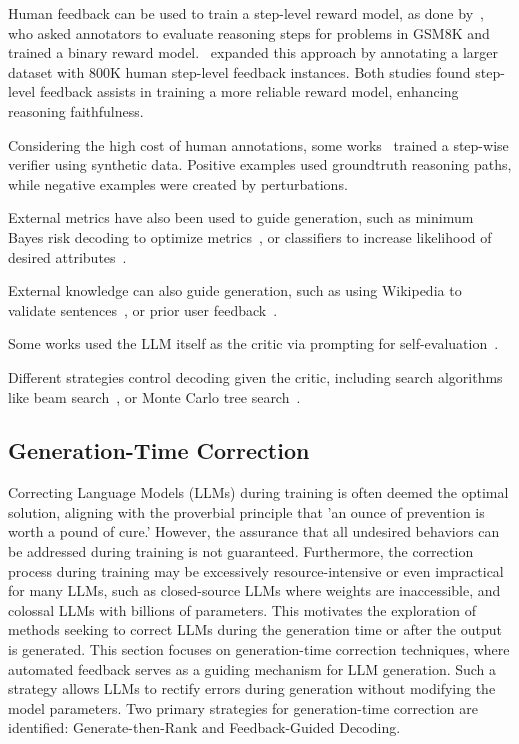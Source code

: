 \documentclass[12pt]{extarticle}
\begin{document}
Human feedback can be used to train a step-level reward model, as done by~\cite{uesato2022solving}, who asked annotators to evaluate reasoning steps for problems in GSM8K and trained a binary reward model.~\cite{lightman2023lets} expanded this approach by annotating a larger dataset with 800K human step-level feedback instances. Both studies found step-level feedback assists in training a more reliable reward model, enhancing reasoning faithfulness.

Considering the high cost of human annotations, some works~\cite{yang-etal-2022-generating, tafjord-etal-2022-entailer, li-etal-2023-making, khalifa2023grace} trained a step-wise verifier using synthetic data. Positive examples used groundtruth reasoning paths, while negative examples were created by perturbations.

External metrics have also been used to guide generation, such as minimum Bayes risk decoding to optimize metrics~\cite{freitag-etal-2022-high}, or classifiers to increase likelihood of desired attributes~\cite{dathathri2020plug, yang-klein-2021-fudge, li2022diffusionlm}.

External knowledge can also guide generation, such as using Wikipedia to validate sentences~\cite{varshney2023stitch}, or prior user feedback~\cite{madaan-etal-2022-memory}.

Some works used the LLM itself as the critic via prompting for self-evaluation~\cite{yao2023tree, xie2023selfevaluation}.

Different strategies control decoding given the critic, including search algorithms like beam search~\cite{khalifa2023grace, xie2023selfevaluation}, or Monte Carlo tree search~\cite{zhu-etal-2023-solving, hao2023reasoning}.

\subsection{Generation-Time Correction}
Correcting Language Models (LLMs) during training is often deemed the optimal solution, aligning with the proverbial principle that 'an ounce of prevention is worth a pound of cure.' However, the assurance that all undesired behaviors can be addressed during training is not guaranteed. Furthermore, the correction process during training may be excessively resource-intensive or even impractical for many LLMs, such as closed-source LLMs where weights are inaccessible, and colossal LLMs with billions of parameters. This motivates the exploration of methods seeking to correct LLMs during the generation time or after the output is generated. This section focuses on generation-time correction techniques, where automated feedback serves as a guiding mechanism for LLM generation. Such a strategy allows LLMs to rectify errors during generation without modifying the model parameters. Two primary strategies for generation-time correction are identified: Generate-then-Rank and Feedback-Guided Decoding.
\end{document}
